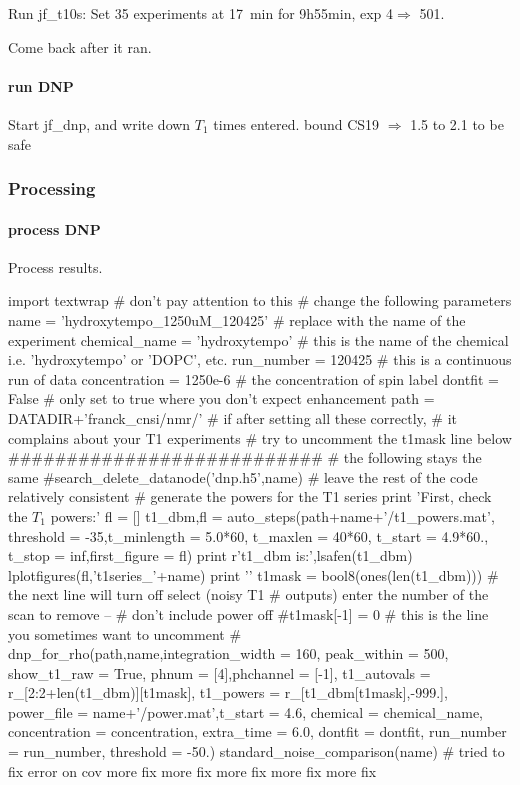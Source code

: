 Run jf\_t10s:
Set 35 experiments at 17~min for 9h55min, exp 4$\Rightarrow$ 501.

Come back after it ran.

\paragraph{run DNP}
Start jf\_dnp, and write down $T_1$ times entered.
bound CS19 $\Rightarrow$ 1.5 to 2.1 to be safe

\subsubsection{Processing}

\paragraph{process DNP}
Process results.


\begin{scriptsize}
\begin{python}[on]
import textwrap # don't pay attention to this
# change the following parameters
name = 'hydroxytempo_1250uM_120425' # replace with the name of the experiment
chemical_name = 'hydroxytempo' # this is the name of the chemical i.e. 'hydroxytempo' or 'DOPC', etc.
run_number = 120425 # this is a continuous run of data
concentration = 1250e-6 # the concentration of spin label
dontfit = False # only set to true where you don't expect enhancement
path = DATADIR+'franck_cnsi/nmr/'
# if after setting all these correctly,
# it complains about your T1 experiments
# try to uncomment the t1mask line below
###########################
# the following stays the same
#search_delete_datanode('dnp.h5',name)
# leave the rest of the code relatively consistent
#{{{ generate the powers for the T1 series
print 'First, check the $T_1$ powers:\n\n'
fl = []
t1_dbm,fl = auto_steps(path+name+'/t1_powers.mat',
    threshold = -35,t_minlength = 5.0*60,
    t_maxlen = 40*60, t_start = 4.9*60.,
    t_stop = inf,first_figure = fl)
print r't1\_dbm is:',lsafen(t1_dbm)
lplotfigures(fl,'t1series_'+name)
print '\n\n'
t1mask = bool8(ones(len(t1_dbm)))
# the next line will turn off select (noisy T1
# outputs) enter the number of the scan to remove --
# don't include power off
#t1mask[-1] = 0 # this is the line you sometimes want to uncomment
#}}}
dnp_for_rho(path,name,integration_width = 160,
        peak_within = 500, show_t1_raw = True,
        phnum = [4],phchannel = [-1],
        t1_autovals = r_[2:2+len(t1_dbm)][t1mask],
        t1_powers = r_[t1_dbm[t1mask],-999.],
        power_file = name+'/power.mat',t_start = 4.6,
        chemical = chemical_name,
        concentration = concentration,
        extra_time = 6.0,
        dontfit = dontfit,
        run_number = run_number,
        threshold = -50.)
standard_noise_comparison(name)
# tried to fix error on cov more fix more fix more fix more fix more fix
\end{python}
\end{scriptsize}

